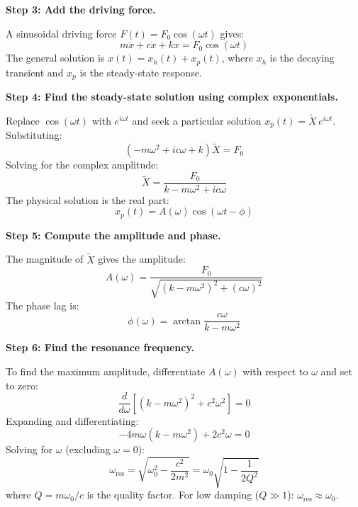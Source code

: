 \textbf{Step 3: Add the driving force.}

A sinusoidal driving force $F(t) = F_0\cos(\omega t)$ gives:
\begin{equation}
m\ddot{x} + c\dot{x} + kx = F_0\cos(\omega t)
\end{equation}
The general solution is $x(t) = x_h(t) + x_p(t)$, where $x_h$ is the decaying transient and $x_p$ is the steady-state response.

\textbf{Step 4: Find the steady-state solution using complex exponentials.}

Replace $\cos(\omega t)$ with $e^{i\omega t}$ and seek a particular solution $x_p(t) = \tilde{X}\,e^{i\omega t}$. Substituting:
\begin{equation}
(-m\omega^2 + ic\omega + k)\tilde{X} = F_0
\end{equation}
Solving for the complex amplitude:
\begin{equation}
\tilde{X} = \frac{F_0}{k - m\omega^2 + ic\omega}
\end{equation}
The physical solution is the real part:
\begin{equation}
x_p(t) = A(\omega)\cos(\omega t - \phi)
\end{equation}

\textbf{Step 5: Compute the amplitude and phase.}

The magnitude of $\tilde{X}$ gives the amplitude:
\begin{equation}
A(\omega) = \frac{F_0}{\sqrt{(k - m\omega^2)^2 + (c\omega)^2}}
\end{equation}
The phase lag is:
\begin{equation}
\phi(\omega) = \arctan\frac{c\omega}{k - m\omega^2}
\end{equation}

\textbf{Step 6: Find the resonance frequency.}

To find the maximum amplitude, differentiate $A(\omega)$ with respect to $\omega$ and set to zero:
\begin{equation}
\frac{d}{d\omega}\left[(k - m\omega^2)^2 + c^2\omega^2\right] = 0
\end{equation}
Expanding and differentiating:
\begin{equation}
-4m\omega(k - m\omega^2) + 2c^2\omega = 0
\end{equation}
Solving for $\omega$ (excluding $\omega = 0$):
\begin{equation}
\omega_{\text{res}} = \sqrt{\omega_0^2 - \frac{c^2}{2m^2}} = \omega_0\sqrt{1 - \frac{1}{2Q^2}}
\end{equation}
where $Q = m\omega_0/c$ is the quality factor. For low damping ($Q \gg 1$): $\omega_{\text{res}} \approx \omega_0$.

